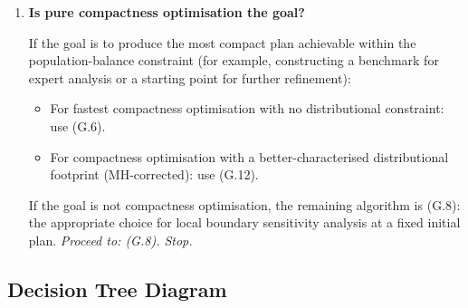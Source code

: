\begin{enumerate}[label=\textbf{Q\arabic*.}]
    If distributional calibration is not required (e.g., the task is
    compactness optimisation or sensitivity analysis), proceed to Q4.

  \item \textbf{Is pure compactness optimisation the goal?}

    If the goal is to produce the most compact plan achievable within
    the population-balance constraint (for example, constructing a
    benchmark for expert analysis or a starting point for further
    refinement):

    \begin{itemize}
      \item For fastest compactness optimisation with no distributional
            constraint: use \sburst{} (G.6).
      \item For compactness optimisation with a better-characterised
            distributional footprint (MH-corrected): use
            \sburstf{} (G.12).
    \end{itemize}

    If the goal is not compactness optimisation, the remaining algorithm
    is \flip{} (G.8): the appropriate choice for local boundary sensitivity
    analysis at a fixed initial plan.
    \emph{Proceed to: \flip{} (G.8). Stop.}

\end{enumerate}

\subsection{Decision Tree Diagram}

